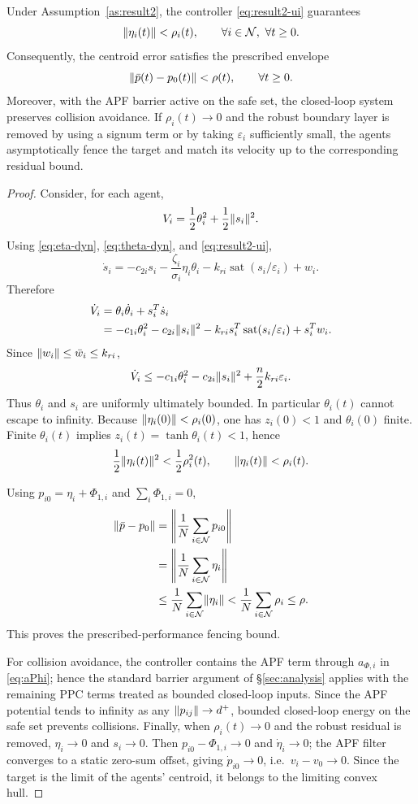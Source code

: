 \begin{theorem}
\label{thm:result2}
Under Assumption~\ref{as:result2}, the controller
\eqref{eq:result2-ui} guarantees
\[
\lVert \eta_i(t) \rVert<\rho_i(t),\qquad \forall i\in\mathcal{N},\ \forall t\ge0.
\]
Consequently, the centroid error satisfies the prescribed envelope
\[
\lVert \bar p(t)-p_0(t) \rVert<\rho(t),\qquad \forall t\ge0.
\]
Moreover, with the APF barrier active on the safe set, the closed-loop
system preserves collision avoidance.  If $\rho_i(t)\to0$ and the robust
boundary layer is removed by using a signum term or by taking
$\varepsilon_i$ sufficiently small, the agents asymptotically fence the
target and match its velocity up to the corresponding residual bound.
\end{theorem}

\begin{proof}
Consider, for each agent,
\[
V_i=\frac12\theta_i^2+\frac12\lVert s_i \rVert^2.
\]
Using \eqref{eq:eta-dyn}, \eqref{eq:theta-dyn}, and
\eqref{eq:result2-ui},
\[
\dot s_i
=-c_{2i}s_i-\frac{\zeta_i}{\sigma_i}\eta_i\theta_i
-k_{ri}\operatorname{sat}(s_i/\varepsilon_i)+w_i.
\]
Therefore
\[
\begin{aligned}
\dot V_i
&=\theta_i\dot\theta_i+s_i^T\dot s_i\\
&=-c_{1i}\theta_i^2-c_{2i}\lVert s_i \rVert^2
-k_{ri}s_i^T\operatorname{sat}(s_i/\varepsilon_i)+s_i^Tw_i.
\end{aligned}
\]
Since $\lVert w_i \rVert\le\bar w_i\le k_{ri}$,
\[
\dot V_i
\le -c_{1i}\theta_i^2-c_{2i}\lVert s_i \rVert^2
+\frac{n}{2}k_{ri}\varepsilon_i.
\]
Thus $\theta_i$ and $s_i$ are uniformly ultimately bounded.  In particular
$\theta_i(t)$ cannot escape to infinity.  Because
$\lVert \eta_i(0) \rVert<\rho_i(0)$, one has $z_i(0)<1$ and $\theta_i(0)$ finite.
Finite $\theta_i(t)$ implies $z_i(t)=\tanh\theta_i(t)<1$, hence
\[
\frac12\lVert \eta_i(t) \rVert^2<\frac12\rho_i^2(t),
\qquad
\lVert \eta_i(t) \rVert<\rho_i(t).
\]

Using $p_{i0}=\eta_i+\Phi_{1,i}$ and $\sum_i\Phi_{1,i}=0$,
\[
\begin{aligned}
\lVert \bar p-p_0 \rVert
&=\left\|\frac1N\sum_{i\in\mathcal{N}}p_{i0}\right\|\\
&=\left\|\frac1N\sum_{i\in\mathcal{N}}\eta_i\right\|\\
&\le \frac1N\sum_{i\in\mathcal{N}}\lVert \eta_i \rVert
< \frac1N\sum_{i\in\mathcal{N}}\rho_i
\le \rho.
\end{aligned}
\]
This proves the prescribed-performance fencing bound.

For collision avoidance, the controller contains the APF term through
$a_{\Phi,i}$ in \eqref{eq:aPhi}; hence the standard barrier argument of
\S\ref{sec:analysis} applies with the remaining PPC terms treated as bounded
closed-loop inputs.  Since the APF potential tends to infinity as any
$\lVert p_{ij} \rVert\to d^+$, bounded closed-loop energy on the safe set prevents
collisions.  Finally, when $\rho_i(t)\to0$ and the robust residual is
removed, $\eta_i\to0$ and $s_i\to0$.  Then
$p_{i0}-\Phi_{1,i}\to0$ and $\dot\eta_i\to0$; the APF filter converges to a
static zero-sum offset, giving $\dot p_{i0}\to0$, i.e.\
$v_i-v_0\to0$.  Since the target is the limit of the agents' centroid, it
belongs to the limiting convex hull.
\end{proof}

